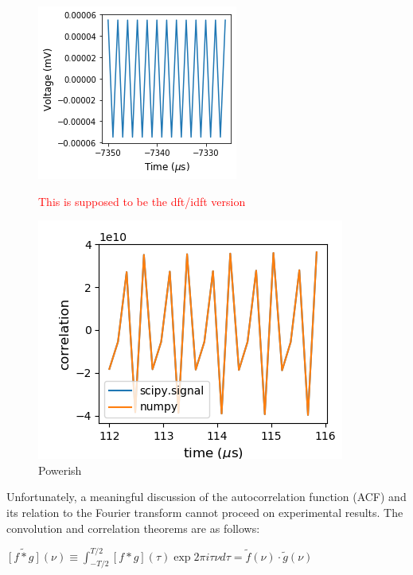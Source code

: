 \documentclass[a4paper]{article}
\begin{document}
\begin{figure}
\centering
\begin{minipage}{.5\textwidth}
	\centering
	\includegraphics[width=.8\linewidth]{5-3/dft_idft}
	\caption{\textcolor{red}{This is supposed to be the dft/idft version}}
	\label{fig:inverse}
\end{minipage}%
\begin{minipage}{.5\textwidth}
	\centering
	\includegraphics[width=.8\linewidth]{5-3/ACF}
	\caption{Powerish}
	\label{fig:ACF}
\end{minipage}
\end{figure}

Unfortunately, a meaningful discussion of the autocorrelation function (ACF) and its relation to the Fourier transform cannot proceed on experimental results. The convolution and correlation theorems are as follows:

$\widetilde{[f * g]}(\nu) \equiv \int_{-T / 2}^{T / 2}[f * g](\tau) \exp{2 \pi i \tau \nu} d \tau = \tilde{f}(\nu) \cdot \tilde{g}(\nu)$
\end{document}
